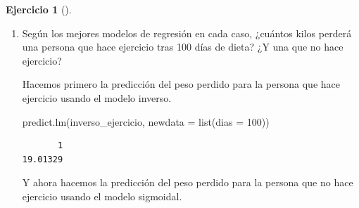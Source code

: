 \documentclass[
  spanish,
  a4paper,
]{scrreport}
\newenvironment{Shaded}{\begin{snugshade}}{\end{snugshade}}
\newcommand{\AttributeTok}[1]{\textcolor[rgb]{0.40,0.45,0.13}{#1}}
\newcommand{\DecValTok}[1]{\textcolor[rgb]{0.68,0.00,0.00}{#1}}
\newcommand{\FunctionTok}[1]{\textcolor[rgb]{0.28,0.35,0.67}{#1}}
\newcommand{\NormalTok}[1]{\textcolor[rgb]{0.00,0.23,0.31}{#1}}
\theoremstyle{definition}
\newtheorem{exercise}{Ejercicio}[chapter]
\theoremstyle{remark}
\begin{document}
\begin{exercise}[]
\begin{enumerate}
\begin{tcolorbox}
\begin{verbatim}

Call:
lm(formula = log(peso.perdido) ~ I(1/dias), data = df[df$ejercicio == 
    "no", ])

Residuals:
     Min       1Q   Median       3Q      Max 
-0.66026 -0.07192  0.04678  0.13142  0.29633 

Coefficients:
            Estimate Std. Error t value Pr(>|t|)    
(Intercept)   2.8694     0.1021   28.09 2.55e-16 ***
I(1/dias)   -24.4226     3.4111   -7.16 1.15e-06 ***
---
Signif. codes:  0 '***' 0.001 '**' 0.01 '*' 0.05 '.' 0.1 ' ' 1

Residual standard error: 0.2417 on 18 degrees of freedom
Multiple R-squared:  0.7401,    Adjusted R-squared:  0.7257 
F-statistic: 51.26 on 1 and 18 DF,  p-value: 1.146e-06
\end{verbatim}

  \end{tcolorbox}
\item
  Según los mejores modelos de regresión en cada caso, ¿cuántos kilos
  perderá una persona que hace ejercicio tras 100 días de dieta? ¿Y una
  que no hace ejercicio?

  \begin{tcolorbox}[enhanced jigsaw, arc=.35mm, bottomrule=.15mm, bottomtitle=1mm, breakable, colback=white, colbacktitle=quarto-callout-tip-color!10!white, colframe=quarto-callout-tip-color-frame, coltitle=black, left=2mm, leftrule=.75mm, opacityback=0, opacitybacktitle=0.6, rightrule=.15mm, title=\textcolor{quarto-callout-tip-color}{\faLightbulb}\hspace{0.5em}{Solución}, titlerule=0mm, toprule=.15mm, toptitle=1mm]

  Hacemos primero la predicción del peso perdido para la persona que
  hace ejercicio usando el modelo inverso.

\begin{Shaded}
\begin{Highlighting}[]
\FunctionTok{predict.lm}\NormalTok{(inverso\_ejercicio, }\AttributeTok{newdata =} \FunctionTok{list}\NormalTok{(}\AttributeTok{dias =} \DecValTok{100}\NormalTok{))}
\end{Highlighting}
\end{Shaded}

\begin{verbatim}
       1 
19.01329 
\end{verbatim}

  Y ahora hacemos la predicción del peso perdido para la persona que no
  hace ejercicio usando el modelo sigmoidal.


\end{tcolorbox}
\end{enumerate}
\end{exercise}
\end{document}
